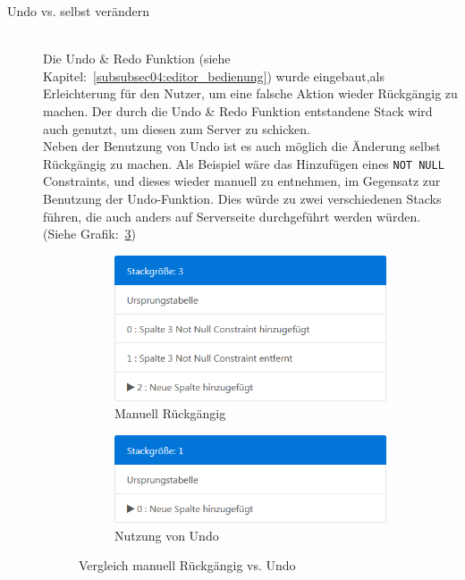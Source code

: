 \begin{description}
\item[Undo vs. selbst verändern] \hfill\\
Die Undo \& Redo Funktion (siehe Kapitel:~\ref{subsubsec04:editor_bedienung}) wurde eingebaut,als Erleichterung für den Nutzer, um eine falsche Aktion wieder Rückgängig zu machen. Der durch die Undo \& Redo Funktion entstandene Stack wird auch genutzt, um diesen zum Server zu schicken. \\
Neben der Benutzung von Undo ist es auch möglich die Änderung selbst Rückgängig zu machen. Als Beispiel wäre das Hinzufügen eines \texttt{NOT NULL} Constraints, und dieses wieder manuell zu entnehmen, im Gegensatz zur Benutzung der Undo-Funktion. 
Dies würde zu zwei verschiedenen Stacks führen, die auch anders auf Serverseite durchgeführt werden würden. (Siehe Grafik:~\ref{fig:self_vs_undo})

\begin{figure}[ht]
  \begin{subfigure}[b]{0.45\textwidth}
    \includegraphics[width=\textwidth]{images/kap-4-self_stack_change.png}
    \caption{Manuell Rückgängig}
    \label{fig:stack_self}
  \end{subfigure}\hfill
  \begin{subfigure}[b]{0.45\textwidth}
    \includegraphics[width=\textwidth]{images/kap-4-undo_stack_change.png}
    \caption{Nutzung von Undo}
    \label{fig:stack_undo}
  \end{subfigure}
  \caption{Vergleich manuell Rückgängig vs. Undo}
  \label{fig:self_vs_undo}
\end{figure}


\end{description}
